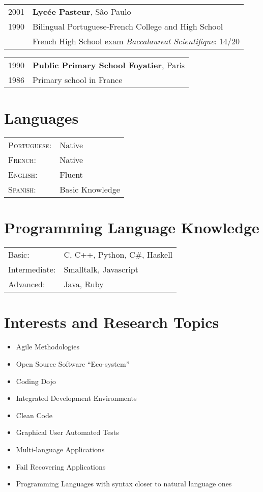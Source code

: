 \documentclass[letter,10pt]{article}
\begin{document}
\begin{tabular}{p{2.5cm}l}
  \textsc{2001} & \textbf{Lycée Pasteur}, São Paulo\\
  \textsc{1990} & Bilingual Portuguese-French College and High School\\
  & French High School exam \textit{Baccalaureat Scientifique}: 14/20
\end{tabular}

\begin{tabular}{p{2.5cm}l}
  \textsc{1990} & \textbf{Public Primary School Foyatier}, Paris\\
  \textsc{1986} & Primary school in France\\
\end{tabular}

\section{Languages}
\begin{tabular}{p{2.5cm}l}
 \textsc{Portuguese:}&Native\\
 \textsc{French:}&Native\\
 \textsc{English:}&Fluent\\
 \textsc{Spanish:}&Basic Knowledge\\
\end{tabular}

\section{Programming Language Knowledge}
\begin{tabular}{p{2.5cm}l}
 Basic:& C, C++, Python, C\#, Haskell\\
 Intermediate:& Smalltalk, Javascript\\
 Advanced:& Java, Ruby\\
\end{tabular}

\section{Interests and Research Topics}

\begin{itemize}
\item Agile Methodologies
\item Open Source Software ``Eco-system''
\item Coding Dojo
\item Integrated Development Environments
\item Clean Code
\item Graphical User Automated Tests
\item Multi-language Applications
\item Fail Recovering Applications
\item Programming Languages with syntax closer to natural language ones
\end{itemize}
\end{document}
